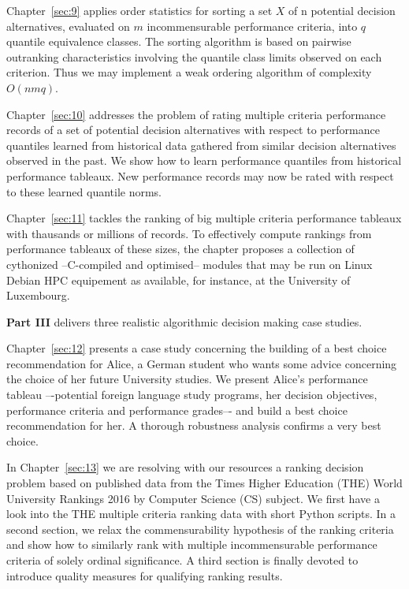 Chapter~\ref{sec:9} applies order statistics for sorting a set $X$ of n potential decision alternatives, evaluated on $m$ incommensurable performance criteria, into $q$ quantile equivalence classes. The sorting algorithm is based on pairwise outranking characteristics involving the quantile class limits observed on each criterion. Thus we may implement a weak ordering algorithm of complexity $O(nmq)$.

Chapter~\ref{sec:10} addresses the problem of rating multiple criteria performance records of a set of potential decision alternatives with respect to performance quantiles learned from historical data gathered from similar decision alternatives observed in the past. We show how to learn performance quantiles from historical performance tableaux. New performance records may now be rated with respect to these learned quantile norms.

Chapter~\ref{sec:11} tackles the ranking of big multiple criteria performance tableaux with thausands or millions of records. To effectively compute rankings from performance tableaux of these sizes, the chapter proposes a collection of cythonized --C-compiled and optimised-- modules that may be run on Linux Debian HPC equipement as available, for instance, at the University of Luxembourg.
\vspace{5pt}

\textbf{Part III} delivers three realistic algorithmic decision making case studies.

Chapter~\ref{sec:12} presents a case study concerning the building of a best choice recommendation for Alice, a German student who wants some advice concerning the choice of her future University studies. We present Alice’s performance tableau –-potential foreign language study programs, her decision objectives, performance criteria and performance grades–- and build a best choice recommendation for her. A thorough robustness analysis confirms a very best choice.

In Chapter~\ref{sec:13} we are resolving with our \Digraph resources a ranking decision problem based on published data from the Times Higher Education (THE) World University Rankings 2016 by Computer Science (CS) subject. We first have a look into the THE multiple criteria ranking data with short Python scripts. In a second section, we relax the commensurability hypothesis of the ranking criteria and show how to similarly rank with multiple incommensurable performance criteria of solely ordinal significance. A third section is finally devoted to introduce quality measures for qualifying ranking results.

